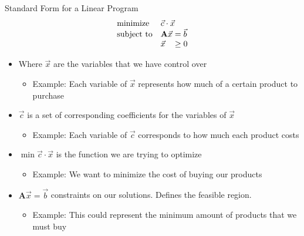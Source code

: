 \documentclass[
	11pt, %
]{beamer}
\begin{document}
\begin{frame}[label={sec:orgc3bccc9}]{Standard Form for a Linear Program}
\begin{align*}
  \begin{array}{ll@{}ll}
    \text{minimize}   & \vec{c} \cdot \vec{x}& \\
    \text{subject to} & \mathbf{A} \vec{x} &=  \vec{b} \\
                      & \vec{x} &\geq 0 \\
    \end{array}
\end{align*}
\pause
\begin{itemize}
\item Where \(\vec{x}\) are the variables that we have control over
\begin{itemize}
\item Example: Each variable of \(\vec{x}\) represents how much of a certain
product to purchase
\end{itemize}
\pause
\item \(\vec{c}\) is a set of corresponding coefficients for the variables of \(\vec{x}\)
\begin{itemize}
\item Example: Each variable of \(\vec{c}\) corresponds to how much each product costs
\end{itemize}
\pause
\item \(\min \vec{c} \cdot \vec{x}\) is the function we are trying to optimize
\begin{itemize}
\item Example: We want to minimize the cost of buying our products
\end{itemize}
\pause
\item \(\mathbf{A} \vec{x} = \vec{b}\) constraints on our solutions. Defines the
feasible region.
\begin{itemize}
\item Example: This could represent the minimum amount of products
that we must buy
\end{itemize}
\pause
\end{itemize}
\end{frame}
\end{document}
